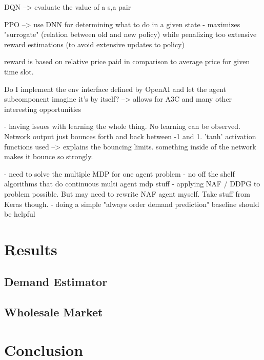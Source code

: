 DQN --> evaluate the value of a s,a pair

\ac{PPO} --> use DNN for determining what to do in a given state - maximizes "surrogate" (relation between old and new
policy) while penalizing too extensive reward estimations (to avoid extensive updates to policy)

reward is based on relative price paid in comparison to average price for given time slot.

Do I implement the env interface defined by OpenAI and let the agent subcomponent imagine it's by itself? --> allows for
A3C and many other interesting opportunities

- having issues with learning the whole thing. No learning can be observed. Network output just bounces forth and back
between -1 and 1. 'tanh' activation functions used --> explains the bouncing limits. something inside of the network
makes it bounce so strongly.


- need to solve the multiple \ac{MDP} for one agent problem
- no off the shelf algorithms that do continuous multi agent mdp stuff
- applying \ac{NAF} / \ac{DDPG} to problem possible. But may need to rewrite \ac{NAF} agent myself. Take stuff from
Keras though. 
- doing a simple "always order demand prediction" baseline should be helpful
\chapter{Results}

\section{Demand Estimator}%
\label{sec:demand_estimator}

\section{Wholesale Market}%
\label{sec:wholesale_market}

\chapter{Conclusion}%
\label{cha:conclusion}

